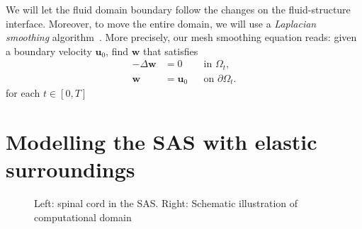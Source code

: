 \documentclass[11pt,a4paper,titlepage]{report}
\begin{document}
We will let the fluid domain boundary follow the changes on the
fluid-structure interface. Moreover, to move the entire domain, we
will use a \emph{Laplacian smoothing}
algorithm~\cite{Winslow1963}. More precisely, our mesh smoothing
equation reads: given a boundary velocity $\mathbf{u}_0$, find
$\mathbf{w}$ that satisfies
\begin{equation}
\begin{aligned}
- \Delta \mathbf{w} &= 0 	&& \text{in } \Omega_t, \\
\mathbf{w} &= \mathbf{u}_0 && \text{on } \partial \Omega_t .
\end{aligned}
\end{equation}
for each $t \in [0, T]$


%
%
%

\section{Modelling the SAS with elastic surroundings}

\begin{figure}
  \caption{Left: spinal cord in the SAS. Right: Schematic illustration
    of computational domain}
\end{figure}
\end{document}
